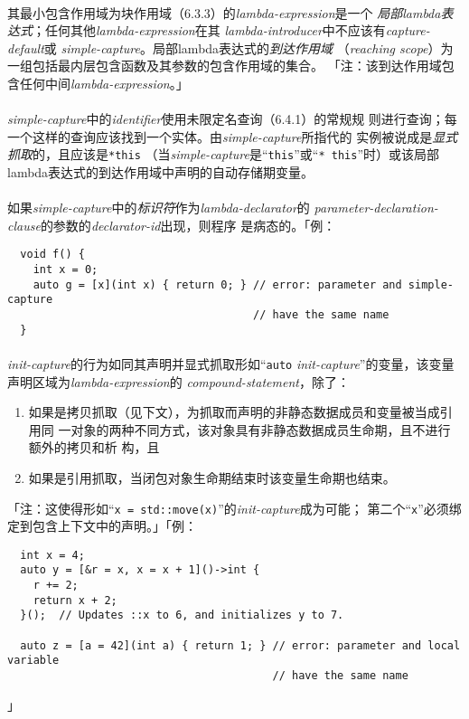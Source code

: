 \paragraph{}
其最小包含作用域为块作用域（6.3.3）的\textit{lambda-expression}是一个
\textit{局部lambda表达式}；任何其他\textit{lambda-expression}在其
\textit{lambda-introducer}中不应该有\textit{capture-default}或
\textit{simple-capture}。局部lambda表达式的\textit{到达作用域}
（\textit{reaching scope}）为一组包括最内层包含函数及其参数的包含作用域的集合。
「注：该到达作用域包含任何中间\textit{lambda-expression}。」

\paragraph{}
\textit{simple-capture}中的\textit{identifier}使用未限定名查询（6.4.1）的常规规
则进行查询；每一个这样的查询应该找到一个实体。由\textit{simple-capture}所指代的
实例被说成是\textit{显式抓取}的，且应该是\texttt{*this}
（当\textit{simple-capture}是``\texttt{this}''或``\texttt{* this}''时）或该局部
lambda表达式的到达作用域中声明的自动存储期变量。

\paragraph{}
如果\textit{simple-capture}中的\textit{标识符}作为\textit{lambda-declarator}的
\textit{parameter-declaration-clause}的参数的\textit{declarator-id}出现，则程序
是病态的。「例：
\begin{lstlisting}
  void f() {
    int x = 0;
    auto g = [x](int x) { return 0; } // error: parameter and simple-capture
                                      // have the same name
  }
\end{lstlisting}

\paragraph{}
\textit{init-capture}的行为如同其声明并显式抓取形如``\texttt{auto}
\textit{init-capture}''的变量，该变量声明区域为\textit{lambda-expression}的
\textit{compound-statement}，除了：
\begin{enumerate}
  \item{如果是拷贝抓取（见下文），为抓取而声明的非静态数据成员和变量被当成引用同
    一对象的两种不同方式，该对象具有非静态数据成员生命期，且不进行额外的拷贝和析
    构，且}
  \item{如果是引用抓取，当闭包对象生命期结束时该变量生命期也结束。}
\end{enumerate}
「注：这使得形如``\texttt{x = std::move(x)}''的\textit{init-capture}成为可能；
第二个``\texttt{x}''必须绑定到包含上下文中的声明。」「例：
\begin{lstlisting}
  int x = 4;
  auto y = [&r = x, x = x + 1]()->int {
    r += 2;
    return x + 2;
  }();  // Updates ::x to 6, and initializes y to 7.

  auto z = [a = 42](int a) { return 1; } // error: parameter and local variable
                                         // have the same name
\end{lstlisting}」

